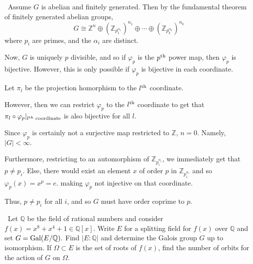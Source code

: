 \documentclass[12pt]{AlgebraQual}
\begin{document}
\begin{solution}$\,$
Assume $G$ is abelian and finitely generated. Then by the fundamental theorem of finitely generated abelian groups, $$G\cong\mathbb{Z}^n\oplus(\mathbb{Z}_{p_1^{\alpha_1}})^{n_1}\oplus\cdots\oplus(\mathbb{Z}_{p_k^{\alpha_k}})^{n_k}$$ where $p_i$ are primes, and the $\alpha_i$ are distinct.

Now, $G$ is uniquely $p$ divisible, and so if $\varphi_p$ is the $p^\text{th}$ power map, then $\varphi_p$ is bijective. However, this is only possible if $\varphi_p$ is bijective in each coordinate.

Let $\pi_l$ be the projection homorphism to the $l^\text{th}$ coordinate.

However, then we can restrict $\varphi_p$ to the $l^\text{th}$ coordinate to get that $\pi_l\circ\varphi_p|_{l^\text{th}\text{ coordinate}}$ is also bijective for all $l$.

Since $\varphi_p$ is certainly not a surjective map restricted to $\mathbb{Z}$, $n=0$. Namely, $|G|<\infty.$

Furthermore, restricting to an automorphism of $\mathbb{Z}_{p_i^{\alpha_i}}$, we immediately get that $p\not=p_i$. Else, there would exist an element $x$ of order $p$ in $\mathbb{Z}_{p_i^{\alpha_i}}$ and so $\varphi_p(x)=x^p=e$. making $\varphi_p$ not injective on that coordinate.

Thus, $p\not=p_i$ for all $i$, and so $G$ must have order coprime to $p$.
\end{solution}
\newpage



\begin{problem} $\,$
Let $\mathbb{Q}$ be the field of rational numbers and consider $f(x)=x^8+x^4+1\in\mathbb{Q}[x].$ Write $E$ for a splitting field for $f(x)$ over $\mathbb{Q}$ and set $G=\text{Gal}(E/\mathbb{Q}).$ Find $|E:\mathbb{Q}|$ and determine the Galois group $G$ up to isomorphism. If $\Omega\subset E$ is the set of roots of $f(x)$, find the number of orbits for the action of $G$ on $\Omega$.
\end{problem}
\end{document}
